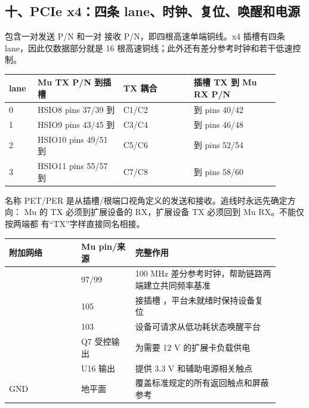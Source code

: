 \subsection{十、PCIe x4：四条 lane、时钟、复位、唤醒和电源}


包含一对发送 P/N 和一对
接收 P/N，即四根高速单端铜线。x4 插槽有四条 lane，因此仅数据部分就是
16 根高速铜线；此外还有差分参考时钟和若干低速控制。

\begin{longtable}{L{0.09\linewidth}L{0.29\linewidth}L{0.23\linewidth}L{0.29\linewidth}}
\toprule
lane & Mu TX P/N 到插槽 & TX 耦合 & 插槽 TX 到 Mu RX P/N \\
 & HSIO8 pins 37/39 到  & C1/C2 &  到 pins 40/42 \\
1 & HSIO9 pins 43/45 到  & C3/C4 &  到 pins 46/48 \\
2 & HSIO10 pins 49/51 到  & C5/C6 &  到 pins 52/54 \\
3 & HSIO11 pins 55/57 到  & C7/C8 &  到 pins 58/60 \\
\bottomrule
\end{longtable}

名称 PET/PER 是从插槽/根端口视角定义的发送和接收。追线时永远先确定方向：
Mu 的 TX 必须到扩展设备的 RX，扩展设备 TX 必须回到 Mu RX。不能仅按两端都
有“TX”字样直接同名相接。

\begin{longtable}{L{0.24\linewidth}L{0.18\linewidth}L{0.48\linewidth}}
\toprule
附加网络 & Mu pin/来源 & 完整作用 \\
\midrule
{} & 97/99 & 100 MHz 差分参考时钟，帮助链路两端建立共同频率基准 \\
 & 105 & 接插槽 ，平台未就绪时保持设备复位 \\
 & 103 & 设备可请求从低功耗状态唤醒平台 \\
 & Q7 受控输出 & 为需要 12 V 的扩展卡负载供电 \\
 & U16 输出 & 提供 3.3 V 和辅助电源相关触点 \\
GND & 地平面 & 覆盖标准规定的所有返回触点和屏蔽参考 \\
\bottomrule
\end{longtable}

